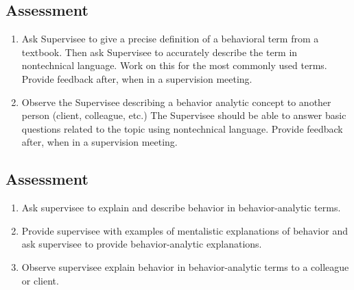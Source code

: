 \subsection{Assessment}
\begin{enumerate}
\item Ask Supervisee to give a precise definition of a behavioral term from a textbook. Then ask Supervisee to accurately describe the term in nontechnical language. Work on this for the most commonly used terms. Provide feedback after, when in a supervision meeting.
\item Observe the Supervisee describing a behavior analytic concept to another person (client, colleague, etc.) The Supervisee should be able to answer basic questions related to the topic using nontechnical language. Provide feedback after, when in a supervision meeting.
\end{enumerate}
%
\subsection{Assessment}
\begin{enumerate}
\item Ask supervisee to explain and describe behavior in behavior-analytic terms.
\item Provide supervisee with examples of mentalistic explanations of behavior and ask supervisee to provide behavior-analytic explanations.
\item Observe supervisee explain behavior in behavior-analytic terms to a colleague or client.
%
\end{enumerate}
%

